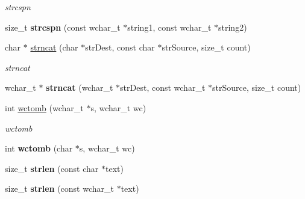 \begin{DoxyCompactItemize}
\begin{DoxyCompactList}\small\item\em strcspn \end{DoxyCompactList}\item 
\hypertarget{namespacestring__util_a2ec3237ea3ddec88e683b0b418383b27}{size\-\_\-t {\bfseries strcspn} (const wchar\-\_\-t $\ast$string1, const wchar\-\_\-t $\ast$string2)}\label{namespacestring__util_a2ec3237ea3ddec88e683b0b418383b27}

\item 
\hypertarget{namespacestring__util_a215cc7e648621d719631efdb01b6d273}{char $\ast$ \hyperlink{namespacestring__util_a215cc7e648621d719631efdb01b6d273}{strncat} (char $\ast$str\-Dest, const char $\ast$str\-Source, size\-\_\-t count)}\label{namespacestring__util_a215cc7e648621d719631efdb01b6d273}

\begin{DoxyCompactList}\small\item\em strncat \end{DoxyCompactList}\item 
\hypertarget{namespacestring__util_aaafd341e0b88e2a0241e009da695c712}{wchar\-\_\-t $\ast$ {\bfseries strncat} (wchar\-\_\-t $\ast$str\-Dest, const wchar\-\_\-t $\ast$str\-Source, size\-\_\-t count)}\label{namespacestring__util_aaafd341e0b88e2a0241e009da695c712}

\item 
\hypertarget{namespacestring__util_a5d1ce3a13f15c1bbbccdc8120e9f2ee3}{int \hyperlink{namespacestring__util_a5d1ce3a13f15c1bbbccdc8120e9f2ee3}{wctomb} (wchar\-\_\-t $\ast$s, wchar\-\_\-t wc)}\label{namespacestring__util_a5d1ce3a13f15c1bbbccdc8120e9f2ee3}

\begin{DoxyCompactList}\small\item\em wctomb \end{DoxyCompactList}\item 
\hypertarget{namespacestring__util_ac014cd94ca1a47bde507f4dcc2057172}{int {\bfseries wctomb} (char $\ast$s, wchar\-\_\-t wc)}\label{namespacestring__util_ac014cd94ca1a47bde507f4dcc2057172}

\item 
\hypertarget{namespacestring__util_a733d7b92d48889fe1ee684a43ccf0095}{size\-\_\-t {\bfseries strlen} (const char $\ast$text)}\label{namespacestring__util_a733d7b92d48889fe1ee684a43ccf0095}

\item 
\hypertarget{namespacestring__util_aaf8e108eb4f1d08b81118bb54d930b90}{size\-\_\-t {\bfseries strlen} (const wchar\-\_\-t $\ast$text)}\label{namespacestring__util_aaf8e108eb4f1d08b81118bb54d930b90}


\end{DoxyCompactItemize}
